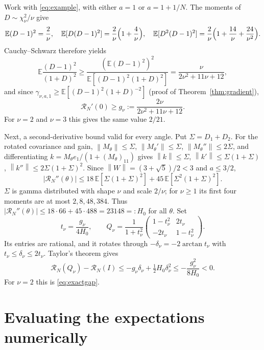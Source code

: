 \documentclass[11pt,a4paper]{article}
\numberwithin{equation}{section}
\theoremstyle{remark}\newtheorem{remark}[theorem]{Remark}
\newcommand{\E}{\mathbb E}
\newcommand{\risk}{\mathcal R}
\newcommand{\norm}[1]{\left\lVert#1\right\rVert}
\begin{document}
Work with \eqref{eq:example}, with either \(a=1\) or \(a=1+1/N\). The moments of
\(D\sim\chi_\nu^2/\nu\) give
\[
 \E(D-1)^2=\frac2\nu,\quad \E[D(D-1)^2]=\frac2\nu\Bigl(1+\frac4\nu\Bigr),\quad
 \E[D^2(D-1)^2]=\frac2\nu\Bigl(1+\frac{14}\nu+\frac{24}{\nu^2}\Bigr).
\]
Cauchy--Schwarz therefore yields
\[
 \E\frac{(D-1)^2}{(1+D)^2}\ge\frac{(\E(D-1)^2)^2}{\E[(D-1)^2(1+D)^2]}=\frac{\nu}{2\nu^2+11\nu+12},
\]
and since \(\gamma_{\nu,a,1}\ge\E[(D-1)^2(1+D)^{-2}]\) (proof of Theorem~\ref{thm:gradient}),
\[
 \risk_N'(0)\ge g_\nu:=\frac{2\nu}{2\nu^2+11\nu+12}.
\]
For \(\nu=2\) and \(\nu=3\) this gives the same value \(2/21\).

Next, a second-derivative bound valid for every angle. Put \(\Sigma=D_1+D_2\). For the rotated
covariance and gain,
\(\norm{M_\theta}\le\Sigma\), \(\norm{M_\theta'}\le\Sigma\), \(\norm{M_\theta''}\le2\Sigma\), and
differentiating \(k=M_\theta e_1/(1+(M_\theta)_{11})\) gives
\(\norm k\le\Sigma\), \(\norm{k'}\le\Sigma(1+\Sigma)\), \(\norm{k''}\le2\Sigma(1+\Sigma)^2\). Since
\(\norm W=(3+\sqrt5)/2<3\) and \(a\le3/2\),
\[
 |\risk_N''(\theta)|\le18\,\E[\Sigma(1+\Sigma)^2]+45\,\E[\Sigma^2(1+\Sigma)^2].
\]
\(\Sigma\) is gamma distributed with shape \(\nu\) and scale \(2/\nu\); for \(\nu\ge1\) its first four
moments are at most \(2,8,48,384\). Thus
\(|\risk_N''(\theta)|\le18\cdot66+45\cdot488=23148=:H_0\) for all \(\theta\). Set
\[
 t_\nu=\frac{g_\nu}{4H_0},\qquad
 Q_\nu=\frac1{1+t_\nu^2}\begin{pmatrix}1-t_\nu^2&2t_\nu\\-2t_\nu&1-t_\nu^2\end{pmatrix}.
\]
Its entries are rational, and it rotates through \(-\delta_\nu=-2\arctan t_\nu\) with
\(t_\nu\le\delta_\nu\le2t_\nu\). Taylor's theorem gives
\[
 \risk_N(Q_\nu)-\risk_N(I)\le-g_\nu\delta_\nu+\tfrac12H_0\delta_\nu^2\le-\frac{g_\nu^2}{8H_0}<0 .
\]
For \(\nu=2\) this is \eqref{eq:exactgap}.

\section{Evaluating the expectations numerically}\label{app:numerics}
\end{document}
